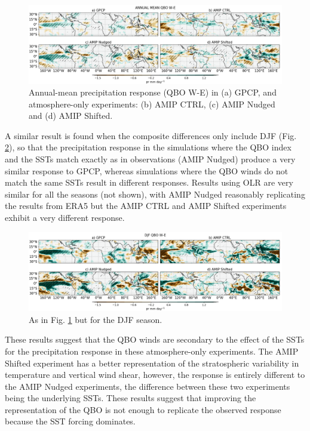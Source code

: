 \begin{figure}[t!]
\centering
 \includegraphics[width=\linewidth]{figures/pr_amip_climqbowqboe.png}
\caption[Annual mean precipitation response in atmosphere-only experiments]{Annual-mean precipitation response (QBO W-E) in (a) GPCP, and atmosphere-only experiments: (b) AMIP CTRL, (c) AMIP Nudged and (d) AMIP Shifted.  }
\label{fig:amip_clim}
\end{figure}

A similar result is found when the composite differences only include DJF (Fig. \ref{fig:amip_djf}), so that the precipitation response in the simulations where the QBO index and the SSTs match exactly as in observations (AMIP Nudged) produce a very similar response to GPCP, whereas simulations where the QBO winds do not match the same SSTs result in different responses. 
Results using OLR are very similar for all the seasons (not shown), with AMIP Nudged reasonably replicating the results from ERA5 but the AMIP CTRL and AMIP Shifted experiments exhibit a very different response.


\begin{figure}[t!]
\centering
 \includegraphics[width=\linewidth]{figures/pr_amip_djfqbowqboe.png}
\caption[DJF mean precipitation response in atmosphere-only experiments]{As in Fig. \ref{fig:amip_clim} but for the DJF season. }
\label{fig:amip_djf}
\end{figure}


These results suggest that the QBO winds are secondary to the effect of the SSTs for the precipitation response in these atmosphere-only experiments. The AMIP Shifted experiment has a better representation of the stratospheric variability in temperature and vertical wind shear, however, the response is entirely different to the AMIP Nudged experiments, the difference between these two experiments being the underlying SSTs. These results suggest that improving the representation of the QBO is not enough to replicate the observed response because the SST forcing dominates. 

